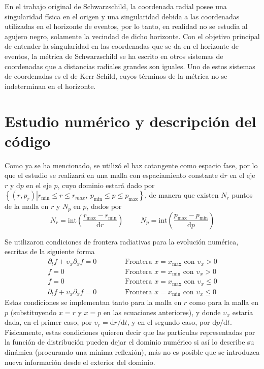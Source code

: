\documentclass[11pt,twoside,openright,spanish]{report}
\numberwithin{equation}{chapter}
\numberwithin{figure}{chapter}
\numberwithin{table}{chapter}
\begin{document}
En el trabajo original de Schwarzschild, la coordenada radial posee una singularidad física en el origen y una singularidad debida a las coordenadas utilizadas en el horizonte de eventos, por lo tanto, en realidad no se estudia al agujero negro, solamente la vecindad de dicho horizonte. Con el objetivo principal de entender la singularidad en las coordenadas que se da en el horizonte de eventos, la métrica de Schwarzschild se ha escrito en otros sistemas de coordenadas que a distancias radiales grandes son iguales. Uno de estos sistemas de coordenadas es el de Kerr-Schild, cuyos términos de la métrica no se indeterminan en el horizonte.

\newpage
\section{Estudio numérico y descripción del código}
\noindent
Como ya se ha mencionado, se utilizó el haz cotangente como espacio fase, por lo que el estudio se realizará en una malla con espaciamiento constante $\text{d}r$ en el eje $r$ y $\text{d}p$ en el eje $p$, cuyo dominio estará dado por $\left\{\left.\left(r,p_r\right)\right|r_{\text{min}}\leq r\leq r_{max},\ p_{\text{min}}\leq p\leq p_{\text{max}}\right\}$, de manera que existen $N_r$ puntos de la malla en $r$ y $N_p$ en $p$, dados por
\begin{equation}
\nonumber
N_r=\text{int}\left(\frac{r_{\text{max}}-r_{\text{min}}}{\text{d}r}\right)\hspace{1cm}N_p=\text{int}\left(\frac{p_{\text{max}}-p_{\text{min}}}{\text{d}p}\right)
\end{equation}

Se utilizaron condiciones de frontera radiativas para la evolución numérica, escritas de la siguiente forma
\begin{eqnarray*}
\partial_t f+\upsilon_x\partial_x f=0&\hspace{1cm}& \text{Frontera $x=x_{\text{max}}$ con }\upsilon_x>0\\
f=0&\hspace{1cm}& \text{Frontera $x=x_{\text{min}}$ con }\upsilon_x>0\\
f=0&\hspace{1cm}& \text{Frontera $x=x_{\text{max}}$ con }\upsilon_x\leq 0\\
\partial_t f+\upsilon_x\partial_x f=0&\hspace{1cm}& \text{Frontera $x=x_{\text{min}}$ con }\upsilon_x\leq 0
\end{eqnarray*}
Estas condiciones se implementan tanto para la malla en $r$ como para la malla en $p$ (substituyendo $x=r$ y $x=p$ en las ecuaciones anteriores), y donde $\upsilon_x$ estaría dada, en el primer caso, por $\upsilon_r=\text{d}r/\text{d}t$, y en el segundo caso, por $\text{d}p/\text{d}t$. Físicamente, estas condiciones quieren decir que las partículas representadas por la función de distribución pueden dejar el dominio numérico si así lo describe su dinámica (procurando una mínima reflexión), más no es posible que se introduzca nueva información desde el exterior del dominio.
\end{document}
